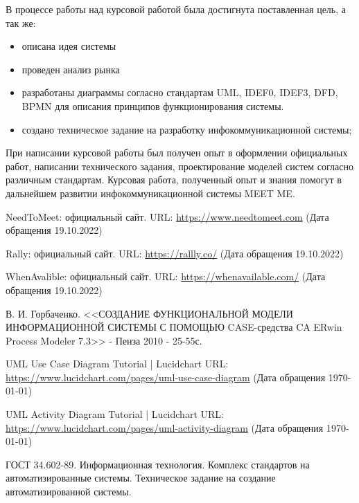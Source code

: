 \documentclass[14pt]{extreport}
\begin{document}
\conclusions
В процессе работы над курсовой работой была достигнута поставленная цель, а так же:
\begin{itemize}
    \item описана идея системы 
    \item проведен анализ рынка 
    \item разработаны диаграммы согласно стандартам UML, IDEF0, IDEF3, DFD, BPMN для описания принципов функционирования системы.
    \item создано техническое задание на разработку инфокоммуникационной системы;
\end{itemize}

При написании курсовой работы был получен опыт в оформлении официальных работ, написании технического задания, проектирование моделей систем согласно различным стандартам. Курсовая работа, полученный опыт и знания помогут в дальнейшем развитии инфокоммуникационной системы MEET ME.

\newpage
\begin{thebibliography}{99}
    \item \label{a:NeetToMeet} NeedToMeet: официальный сайт. URL: \url{https://www.needtomeet.com} (Дата обращения 19.10.2022)
    \item \label{b:Rally} Rally: официальный сайт. URL: \url{https://rallly.co/} (Дата обращения 19.10.2022)
    \item \label{c:WhenAvalible} WhenAvalible: официальный сайт. URL: \url{https://whenavailable.com/} (Дата обращения 19.10.2022)
    \item \label{bib1} В. И. Горбаченко. <<СОЗДАНИЕ ФУНКЦИОНАЛЬНОЙ МОДЕЛИ ИНФОРМАЦИОННОЙ СИСТЕМЫ С ПОМОЩЬЮ CASE-средства CA ERwin Process Modeler 7.3>> - Пенза 2010 - 25-55с.
	\item \label{bib2} 	UML Use Case Diagram Tutorial | Lucidchart URL: \url{https://www.lucidchart.com/pages/uml-use-case-diagram} (Дата обращения \today)
    \item \label{bib3} 	UML Activity Diagram Tutorial | Lucidchart URL: \url{https://www.lucidchart.com/pages/uml-activity-diagram} (Дата обращения \today)
    \item \label{bib4} ГОСТ 34.602-89. Информационная технология. Комплекс стандартов на автоматизированные системы. Техническое задание на создание автоматизированной системы.

\end{thebibliography}
\end{document}

